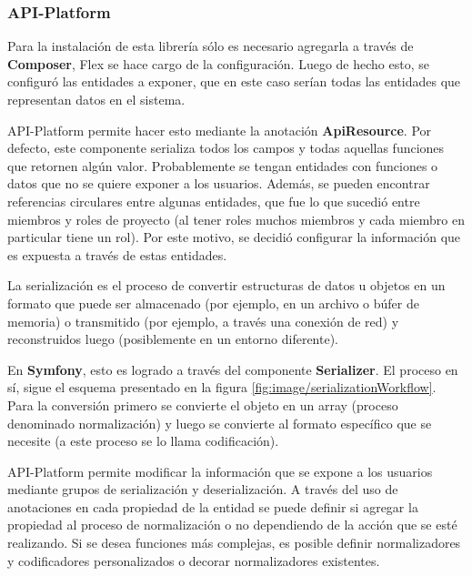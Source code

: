 \subsubsection{API-Platform}%
\label{ssub:api_platform}

Para la instalación de esta librería sólo es necesario agregarla a través de \textbf{Composer}, Flex se hace cargo de la configuración\@. Luego de hecho esto,
se configuró las entidades a exponer, que en este caso serían todas las entidades que representan datos en el sistema.


API-Platform permite hacer esto mediante la anotación \textbf{ApiResource}. Por defecto, este componente serializa todos los campos y todas aquellas funciones
que retornen algún valor\@. Probablemente se tengan entidades con funciones o datos que no se quiere exponer a los usuarios. Además, se pueden encontrar
referencias circulares entre algunas entidades, que fue lo que sucedió entre miembros y roles de proyecto (al tener roles muchos miembros y cada miembro
en particular tiene un rol). Por este motivo, se decidió configurar la información que es expuesta a través de estas entidades.



La serialización es el proceso de convertir estructuras de datos u objetos en un formato que puede ser almacenado (por ejemplo, en un archivo o búfer de memoria)
o transmitido (por ejemplo, a través una conexión de red) y reconstruidos luego (posiblemente en un entorno diferente).~\textcite{serialization}

En \textbf{Symfony}, esto es logrado a través del componente \textbf{Serializer}. El proceso en sí, sigue el esquema presentado en la figura
\ref{fig:image/serializationWorkflow}\@.
Para la conversión primero se convierte el objeto en un array (proceso denominado
normalización) y luego se convierte al formato específico que se necesite (a este proceso se lo llama codificación).

API-Platform permite modificar la información que se expone a los usuarios mediante grupos de serialización y deserialización\@. A través del uso de anotaciones
en cada propiedad de la entidad se puede definir si agregar la propiedad al proceso de normalización o no dependiendo de la acción que se esté realizando.
Si se desea funciones más complejas, es posible definir normalizadores y codificadores personalizados o decorar normalizadores existentes.~\textcite{api-platform-serialization}



